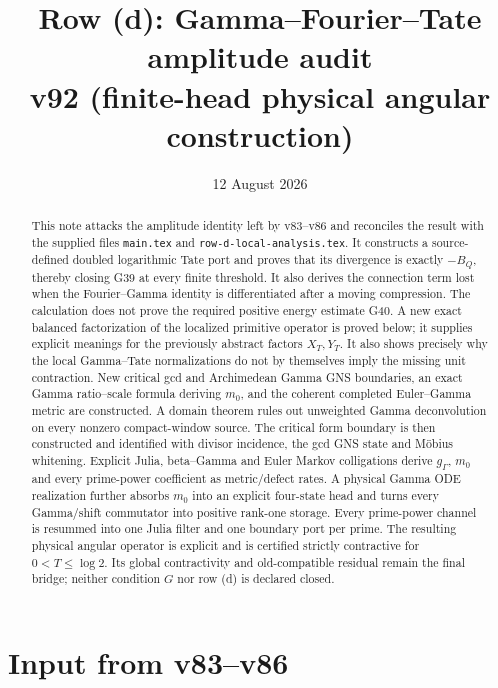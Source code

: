 \documentclass[11pt]{article}
\title{Row (d): Gamma--Fourier--Tate amplitude audit\\
v92 (finite-head physical angular construction)}
\author{}
\date{12 August 2026}
\begin{document}
\maketitle

\begin{abstract}
This note attacks the amplitude identity left by v83--v86 and reconciles the
result with the supplied files \texttt{main.tex} and
\texttt{row-d-local-analysis.tex}.  It constructs a
source-defined doubled logarithmic Tate port and proves that its divergence is
exactly $-B_Q$, thereby closing G39 at every finite threshold.  It also derives
the connection term lost when the Fourier--Gamma identity is differentiated
after a moving compression.  The calculation does not prove the required
positive energy estimate G40.  A new exact balanced factorization of the
localized primitive operator is proved below; it supplies explicit meanings
for the previously abstract factors $X_T,Y_T$.  It also shows precisely why
the local Gamma--Tate normalizations do not by themselves imply the missing
unit contraction.  New critical gcd and Archimedean Gamma GNS boundaries,
an exact Gamma ratio--scale formula deriving $m_0$, and the coherent completed
Euler--Gamma metric are constructed.  A domain theorem rules out unweighted
Gamma deconvolution on every nonzero compact-window source.  The critical
form boundary is then constructed and identified with divisor incidence, the
gcd GNS state and M\"obius whitening.  Explicit Julia, beta--Gamma and Euler
Markov colligations derive $g_\Gamma$, $m_0$ and every prime-power coefficient
as metric/defect rates.  A physical Gamma ODE realization further absorbs
$m_0$ into an explicit four-state head and turns every Gamma/shift commutator
into positive rank-one storage.  Every prime-power channel is resummed into
one Julia filter and one boundary port per prime.  The resulting physical
angular operator is explicit and is certified strictly contractive for
$0<T\le\log2$.  Its global contractivity and old-compatible residual remain
the final bridge; neither condition $G$ nor row (d) is declared closed.
\end{abstract}

\section{Input from v83--v86}
\end{document}
